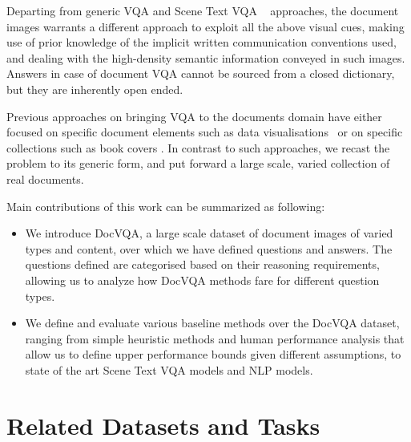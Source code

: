 \documentclass[10pt,twocolumn,letterpaper]{article}
\newcommand{\datasetName}{DocVQA\xspace}
\begin{document}
Departing from generic VQA \cite{vqa2} and Scene Text VQA ~\cite{textvqa,stvqa_iccv} approaches, the document images warrants a different approach to exploit all the above visual cues, making use of prior knowledge of the implicit written communication conventions used, and dealing with the high-density semantic information conveyed in such images.
Answers in case of document VQA cannot be sourced from a closed dictionary, but they are inherently open ended.

Previous approaches on bringing VQA to the documents domain have either focused on specific document elements such as data visualisations~\cite{dvqa, kahou2017figureqa} or on specific collections such as book covers \cite{mishra2019ocr}. In contrast to such approaches, we recast the problem to its generic form, and put forward a large scale, varied collection of real documents.




Main contributions of this work can be summarized as following:
\begin{itemize}[noitemsep,nolistsep]
\item We introduce \datasetName, a large scale dataset of  document images of varied types and content, over which we have defined  questions and answers. The questions defined are categorised based on their reasoning requirements, allowing us to analyze how \datasetName methods fare for different question types.

\item We define and evaluate various baseline methods over the \datasetName dataset, ranging from simple heuristic methods and human performance analysis that allow us to define upper performance bounds given different assumptions, to state of the art Scene Text VQA models and NLP models.
\end{itemize}





\section{Related Datasets and Tasks}
\end{document}
